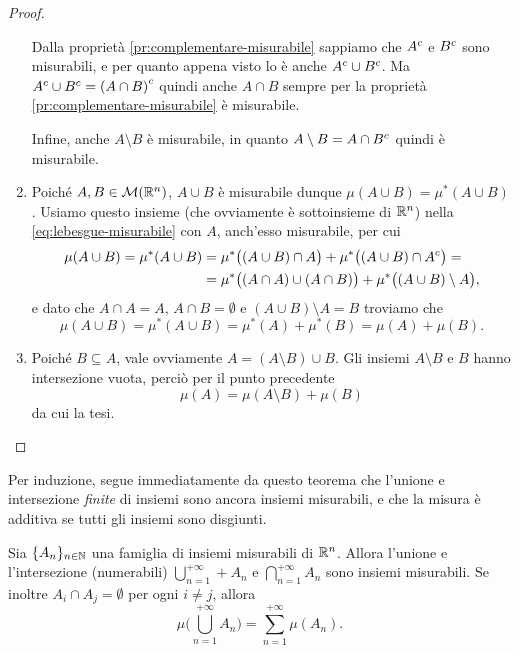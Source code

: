 \begin{proof}
\begin{enumerate}
			Dalla proprietà \ref{pr:complementare-misurabile} sappiamo che ${A}^c$ e ${B}^c$ sono misurabili, e per quanto appena visto lo è anche ${A}^c\cup{B}^c$.
			Ma ${A}^c\cup{B}^c={(A\cap B)}^c$ quindi anche $A\cap B$ sempre per la proprietà \ref{pr:complementare-misurabile} è misurabile.

			Infine, anche $A\setminus B$ è misurabile, in quanto $A\setminus B=A\cap{B}^c$ quindi è misurabile.
		\item Poich\'e $A,B\in\mathcal M(\mathbb{R}^n)$, $A\cup B$ è misurabile dunque $\mu(A\cup B)=\mu^*(A\cup B)$.
			Usiamo questo insieme (che ovviamente è sottoinsieme di $\mathbb{R}^n$) nella \eqref{eq:lebesgue-misurabile} con $A$, anch'esso misurabile, per cui
			\begin{equation}
				\begin{split}
					\mu(A\cup B)=\mu^*(A\cup B)&=\mu^*\big((A\cup B)\cap A\big)+\mu^*\big((A\cup B)\cap{A}^c\big)=\\
					&=\mu^*\big((A\cap A)\cup(A\cap B)\big)+\mu^*\big((A\cup B)\setminus A\big),
				\end{split}
			\end{equation}
			e dato che $A\cap A=A$, $A\cap B=\emptyset$ e $(A\cup B)\setminus A=B$ troviamo che
			\begin{equation}
				\mu(A\cup B)=\mu^*(A\cup B)=\mu^*(A)+\mu^*(B)=\mu(A)+\mu(B).
			\end{equation}
		\item Poich\'e $B\subseteq A$, vale ovviamente $A=(A\setminus B)\cup B$.
			Gli insiemi $A\setminus B$ e $B$ hanno intersezione vuota, perciò per il punto precedente
			\begin{equation}
				\mu(A)=\mu(A\setminus B)+\mu(B)
			\end{equation}
			da cui la tesi.\qedhere
	\end{enumerate}
\end{proof}
Per induzione, segue immediatamente da questo teorema che l'unione e intersezione \emph{finite} di insiemi sono ancora insiemi misurabili, e che la misura è additiva se tutti gli insiemi sono disgiunti.
\begin{proprieta} \label{pr:additivita-numerabile-lebesgue}
	Sia $\{A_n\}_{n\in\mathbb{N}}$ una famiglia di insiemi misurabili di $\mathbb{R}^n$.
	Allora l'unione e l'intersezione (numerabili) $\bigcup_{n=1}^{+\infty}+A_n$ e $\bigcap_{n=1}^{+\infty}A_n$ sono insiemi misurabili.
	Se inoltre $A_i\cap A_j=\emptyset$ per ogni $i\neq j$, allora
	\begin{equation}
		\mu\bigg(\bigcup_{n=1}^{+\infty}A_n\bigg)=\sum_{n=1}^{+\infty}\mu(A_n).
		\label{eq:additivita-numerabile-lebesgue}
	\end{equation}
\end{proprieta}
